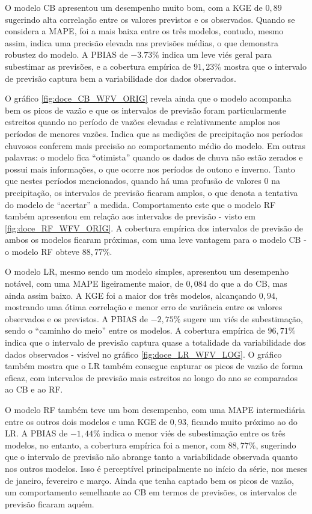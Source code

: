 O modelo CB apresentou um desempenho muito bom, com a KGE de $0,89$ sugerindo alta correlação entre os valores previstos e os observados. Quando se considera a MAPE, foi a mais baixa entre os três modelos, contudo, mesmo assim, indica uma precisão elevada nas previsões médias, o que demonstra robustez do modelo. A PBIAS de $-3.73\%$ indica um leve viés geral para subestimar as previsões, e a cobertura empírica de $91,23\%$ mostra que o intervalo de previsão captura bem a variabilidade dos dados observados.

O gráfico \ref{fig:doce_CB_WFV_ORIG} revela ainda que o modelo acompanha bem os picos de vazão e que os intervalos de previsão foram particularmente estreitos quando no período de vazões elevadas e relativamente amplos nos períodos de menores vazões. Indica que as medições de precipitação nos períodos chuvosos conferem mais precisão ao comportamento médio do modelo. Em outras palavras: o modelo fica ``otimista'' quando os dados de chuva não estão zerados e possui mais informações, o que ocorre nos períodos de outono e inverno. Tanto que nestes períodos mencionados, quando há uma profusão de valores $0$ na precipitação, os intervalos de previsão ficaram amplos, o que denota a tentativa do modelo de ``acertar'' a medida. Comportamento este que o modelo RF também apresentou em relação aos intervalos de previsão - visto em \ref{fig:doce_RF_WFV_ORIG}. A cobertura empírica dos intervalos de previsão de ambos os modelos ficaram próximas, com uma leve vantagem para o modelo CB - o modelo RF obteve $88,77\%$.

O modelo LR, mesmo sendo um modelo simples, apresentou um desempenho notável, com uma MAPE ligeiramente maior, de $0,084$ do que a do CB, mas ainda assim baixo. A KGE foi a maior dos três modelos, alcançando $0,94$, mostrando uma ótima correlação e menor erro de variância entre os valores observados e os previstos. A PBIAS de $-2,75\%$ sugere um viés de subestimação, sendo o ``caminho do meio'' entre os modelos. A cobertura empírica de $96,71\%$ indica que o intervalo de previsão captura quase a totalidade da variabilidade dos dados observados - visível no gráfico \ref{fig:doce_LR_WFV_LOG}. O gráfico também mostra que o LR também consegue capturar os picos de vazão de forma eficaz, com intervalos de previsão mais estreitos ao longo do ano se comparados ao CB e ao RF.

O modelo RF também teve um bom desempenho, com uma MAPE intermediária entre os outros dois modelos e uma KGE de $0,93$, ficando muito próximo ao do LR. A PBIAS de $-1,44\%$ indica o menor viés de subestimação entre os três modelos, no entanto, a cobertura empírica foi a menor, com $88,77\%$, sugerindo que o intervalo de previsão não abrange tanto a variabilidade observada quanto nos outros modelos. Isso é perceptível principalmente no início da série, nos meses de janeiro, fevereiro e março. Ainda que tenha captado bem os picos de vazão, um comportamento semelhante ao CB em termos de previsões, os intervalos de previsão ficaram aquém.

